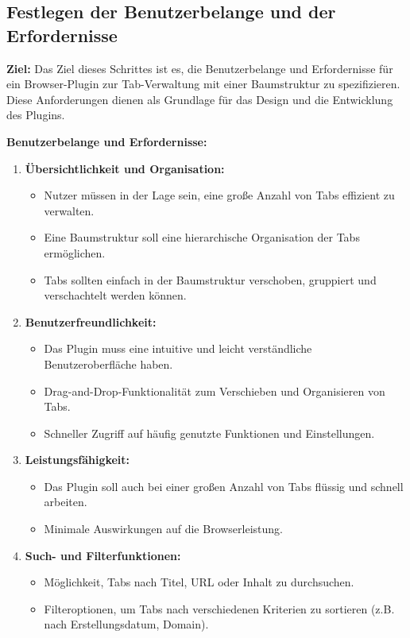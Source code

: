\subsection{Festlegen der Benutzerbelange und der Erfordernisse}

\textbf{Ziel:} Das Ziel dieses Schrittes ist es, die Benutzerbelange und Erfordernisse für ein Browser-Plugin zur Tab-Verwaltung mit einer Baumstruktur zu spezifizieren. Diese Anforderungen dienen als Grundlage für das Design und die Entwicklung des Plugins.

\textbf{Benutzerbelange und Erfordernisse:}

\begin{enumerate}
    \item \textbf{Übersichtlichkeit und Organisation:}
    \begin{itemize}
        \item Nutzer müssen in der Lage sein, eine große Anzahl von Tabs effizient zu verwalten.
        \item Eine Baumstruktur soll eine hierarchische Organisation der Tabs ermöglichen.
        \item Tabs sollten einfach in der Baumstruktur verschoben, gruppiert und verschachtelt werden können.
    \end{itemize}
    
    \item \textbf{Benutzerfreundlichkeit:}
    \begin{itemize}
        \item Das Plugin muss eine intuitive und leicht verständliche Benutzeroberfläche haben.
        \item Drag-and-Drop-Funktionalität zum Verschieben und Organisieren von Tabs.
        \item Schneller Zugriff auf häufig genutzte Funktionen und Einstellungen.
    \end{itemize}
    
    \item \textbf{Leistungsfähigkeit:}
    \begin{itemize}
        \item Das Plugin soll auch bei einer großen Anzahl von Tabs flüssig und schnell arbeiten.
        \item Minimale Auswirkungen auf die Browserleistung.
    \end{itemize}
    
    \item \textbf{Such- und Filterfunktionen:}
    \begin{itemize}
        \item Möglichkeit, Tabs nach Titel, URL oder Inhalt zu durchsuchen.
        \item Filteroptionen, um Tabs nach verschiedenen Kriterien zu sortieren (z.B. nach Erstellungsdatum, Domain).
    \end{itemize}
    

\end{enumerate}
